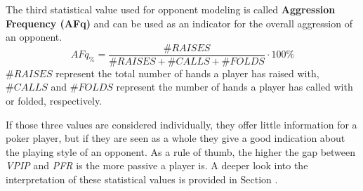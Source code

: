 The third statistical value used for opponent modeling is called \textbf{Aggression Frequency (AFq)} and can be used as an indicator for the overall aggression of an opponent. 
\begin{equation}
\label{eq:afq}
AFq_{\%} = \frac{\#RAISES}{\#RAISES + \#CALLS + \#FOLDS}  \cdot 100\%
\end{equation}
$\#RAISES$ represent the total number of hands a player has raised with, $\#CALLS$ and $\#FOLDS$ represent the number of hands a player has called with or folded, respectively. \par
If those three values are considered individually, they offer little information for a poker player, but if they are seen as a whole they give a good indication about the playing style of an opponent. As a rule of thumb, the higher the gap between \textit{VPIP} and \textit{PFR} is the more passive a player is. A deeper look into the interpretation of these statistical values is provided in Section  \cite{playing_style}. 
